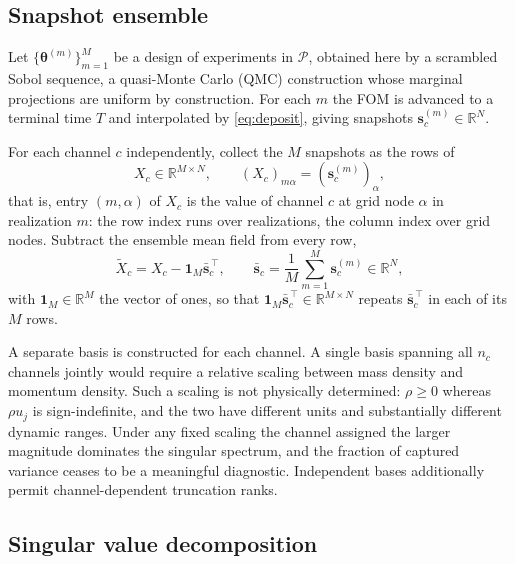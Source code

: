 \documentclass[11pt]{article}
\newcommand{\R}{\mathbb{R}}
\newcommand{\bs}[1]{\boldsymbol{#1}}
\begin{document}
\subsection{Snapshot ensemble}

Let $\{\bs{\theta}^{(m)}\}_{m=1}^{M}$ be a design of experiments in $\mathcal{P}$, obtained
here by a scrambled Sobol sequence, a quasi-Monte Carlo (QMC) construction whose marginal
projections are uniform by construction. For each $m$ the FOM is advanced to a terminal time
$T$ and interpolated by \eqref{eq:deposit}, giving snapshots $\bs{s}_c^{(m)} \in \R^{N}$.

For each channel $c$ independently, collect the $M$ snapshots as the rows of
\begin{equation}
  X_c \in \R^{M \times N},
  \qquad
  \left( X_c \right)_{m\alpha} = \left( \bs{s}_c^{(m)} \right)_{\!\alpha} ,
  \label{eq:snapshot-matrix}
\end{equation}
that is, entry $(m, \alpha)$ of $X_c$ is the value of channel $c$ at grid node $\alpha$
in realization $m$: the row index runs over realizations, the column index over grid nodes.
Subtract the ensemble mean field from every row,
\begin{equation}
  \tilde{X}_c = X_c - \bs{1}_M \bar{\bs{s}}_c^{\,\top},
  \qquad
  \bar{\bs{s}}_c = \frac{1}{M} \sum_{m=1}^{M} \bs{s}_c^{(m)} \in \R^{N},
  \label{eq:centering}
\end{equation}
with $\bs{1}_M \in \R^{M}$ the vector of ones, so that $\bs{1}_M \bar{\bs{s}}_c^{\,\top}
\in \R^{M \times N}$ repeats $\bar{\bs{s}}_c^{\,\top}$ in each of its $M$ rows.

A separate basis is constructed for each channel. A single basis spanning all $n_c$ channels
jointly would require a relative scaling between mass density and momentum density. Such a
scaling is not physically determined: $\rho \geq 0$ whereas $\rho u_j$ is sign-indefinite,
and the two have different units and substantially different dynamic ranges. Under any fixed
scaling the channel assigned the larger magnitude dominates the singular spectrum, and the
fraction of captured variance ceases to be a meaningful diagnostic. Independent bases
additionally permit channel-dependent truncation ranks.

\subsection{Singular value decomposition}
\end{document}
